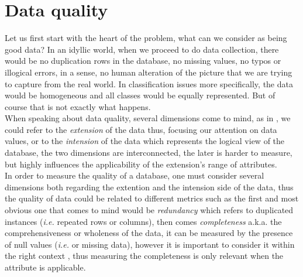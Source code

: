 \documentclass{article}
\begin{document}

\section{Data quality} %
\label{sec:Data quality}
Let us first start with the heart of the problem, what can we consider as being good data? In an idyllic world, when we proceed to do data collection, there would be no duplication rows in the database, no missing values, no typos or illogical errors, in a sense, no human alteration of the picture that we are trying to capture from the real world. In classification issues more specifically, the data would be homogeneous and all classes would be equally represented. But of course that is not exactly what happens. \\
When speaking about data quality, several dimensions come to mind, as in \cite{amazon}, we could refer to the \textit{extension} of the data thus, focusing our attention on data values, or to the \textit{intension} of the data which represents the logical view of the database, the two dimensions are interconnected, the later is harder to measure, but highly influences the applicability of the extension's range of attributes.\\
In order to measure the quality of a database, one must consider several dimensions both regarding the extention and the intension side of the data, thus the quality of data could be related to different metrics such as the first and most obvious one that comes to mind would be \textit{redundancy} which refers to duplicated instances (\textit{i.e.} repeated rows or columns), then comes \textit{completeness} a.k.a. the comprehensiveness or wholeness of the data, it can be measured by the presence of null values (\textit{i.e.} or missing data), however it is important to consider it within the right context  \cite{amazon}, thus measuring the completeness is only relevant when the attribute is applicable. \\
\end{document}
